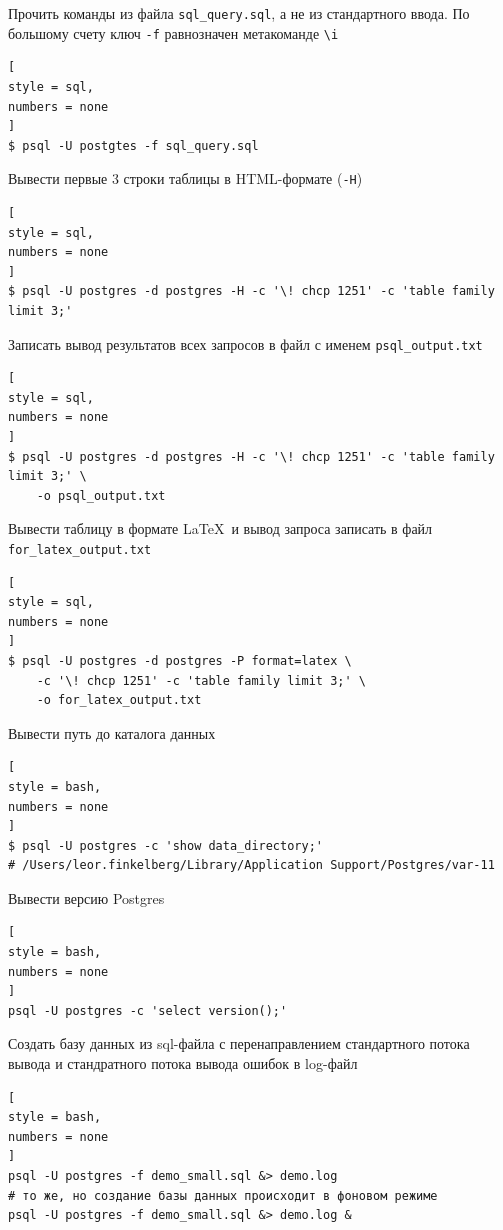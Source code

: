 \documentclass[%
	11pt,
	a4paper,
	utf8,
		]{article}
\begin{document}

Прочить команды из файла \texttt{sql\_query.sql}, а не из стандартного ввода. По большому счету ключ \texttt{-f} равнозначен метакоманде \verb|\i|
\begin{lstlisting}[
style = sql,
numbers = none
]
$ psql -U postgtes -f sql_query.sql
\end{lstlisting}

Вывести первые 3 строки таблицы в HTML-формате (\texttt{-H})
\begin{lstlisting}[
style = sql,
numbers = none
]
$ psql -U postgres -d postgres -H -c '\! chcp 1251' -c 'table family limit 3;'
\end{lstlisting}

Записать вывод результатов всех запросов в файл с именем \texttt{psql\_output.txt}
\begin{lstlisting}[
style = sql,
numbers = none
]
$ psql -U postgres -d postgres -H -c '\! chcp 1251' -c 'table family limit 3;' \
    -o psql_output.txt
\end{lstlisting}

Вывести таблицу в формате \LaTeX\ и вывод запроса записать в файл \texttt{for\_latex\_output.txt}
\begin{lstlisting}[
style = sql,
numbers = none
]
$ psql -U postgres -d postgres -P format=latex \
    -c '\! chcp 1251' -c 'table family limit 3;' \
    -o for_latex_output.txt
\end{lstlisting}

Вывести путь до каталога данных
\begin{lstlisting}[
style = bash,
numbers = none	
]
$ psql -U postgres -c 'show data_directory;'
# /Users/leor.finkelberg/Library/Application Support/Postgres/var-11 
\end{lstlisting}

Вывести версию Postgres
\begin{lstlisting}[
style = bash,
numbers = none	
]
psql -U postgres -c 'select version();'
\end{lstlisting}

Создать  базу данных из sql-файла с перенаправлением стандартного потока вывода и стандратного потока вывода ошибок в log-файл
\begin{lstlisting}[
style = bash,
numbers = none	
]
psql -U postgres -f demo_small.sql &> demo.log
# то же, но создание базы данных происходит в фоновом режиме
psql -U postgres -f demo_small.sql &> demo.log &
\end{lstlisting}
\end{document}
